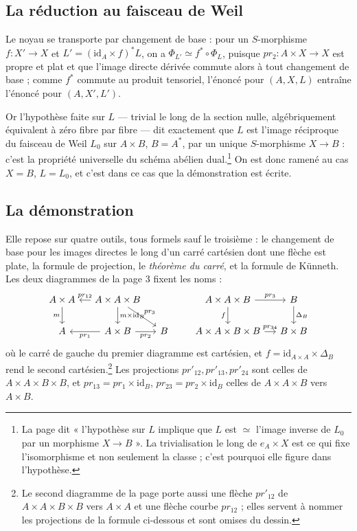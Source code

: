 \documentclass[11pt,a4paper]{article}
\begin{document}
\subsection*{La réduction au faisceau de Weil}

Le noyau se transporte par changement de base : pour un $S$-morphisme
$f \colon X' \to X$ et $L' = (\mathrm{id}_A \times f)^{*}L$, on a
$\Phi_{L'} \simeq f^{*} \circ \Phi_L$, puisque $pr_2 \colon A \times X \to X$
est propre et plat et que l'image directe dérivée commute alors à tout
changement de base ; comme $f^{*}$ commute au produit tensoriel, l'énoncé
pour $(A, X, L)$ entraîne l'énoncé pour $(A, X', L')$.

Or l'hypothèse faite sur $L$ — trivial le long de la section nulle,
algébriquement équivalent à zéro fibre par fibre — dit exactement que $L$ est
l'image réciproque du faisceau de Weil $L_0$ sur $A \times B$, $B = A^{*}$,
par un unique $S$-morphisme $X \to B$ : c'est la propriété universelle du
schéma abélien dual.\footnote{La page dit « l'hypothèse sur $L$ implique que
$L$ est $\simeq$ l'image inverse de $L_0$ par un morphisme $X \to B$ ». La
trivialisation le long de $e_A \times X$ est ce qui fixe l'isomorphisme et non
seulement la classe ; c'est pourquoi elle figure dans l'hypothèse.} On est
donc ramené au cas $X = B$, $L = L_0$, et c'est dans ce cas que la
démonstration est écrite.

\subsection*{La démonstration}

Elle repose sur quatre outils, tous formels sauf le troisième : le
changement de base pour les images directes le long d'un carré cartésien
dont une flèche est plate, la formule de projection, le \emph{théorème du
carré}, et la formule de Künneth. Les deux diagrammes de la page 3 fixent les
noms :
\[
\begin{tikzcd}[column sep=small]
A \times A \arrow[d, "m"'] & A \times A \times B \arrow[l, "pr_{12}"'] \arrow[d, "m \times \mathrm{id}_B"] \arrow[dr, "pr_3"] & \\
A & A \times B \arrow[l, "pr_1"] \arrow[r, "pr_2"'] & B
\end{tikzcd}
\qquad
\begin{tikzcd}[column sep=small]
A \times A \times B \arrow[r, "pr_3"] \arrow[d, "f"'] & B \arrow[d, "\Delta_B"] \\
A \times A \times B \times B \arrow[r, "pr_{34}"] & B \times B
\end{tikzcd}
\]
où le carré de gauche du premier diagramme est cartésien, et
$f = \mathrm{id}_{A \times A} \times \Delta_B$ rend le second
cartésien.\footnote{Le second diagramme de la page porte aussi une flèche
$pr'_{12}$ de $A \times A \times B \times B$ vers $A \times A$ et une flèche
courbe $pr_{12}$ ; elles servent à nommer les projections de la formule
ci-dessous et sont omises du dessin.} Les projections
$pr'_{12}, pr'_{13}, pr'_{24}$ sont celles de $A \times A \times B \times B$,
et $pr_{13} = pr_1 \times \mathrm{id}_B$, $pr_{23} = pr_2 \times
\mathrm{id}_B$ celles de $A \times A \times B$ vers $A \times B$.
\end{document}
